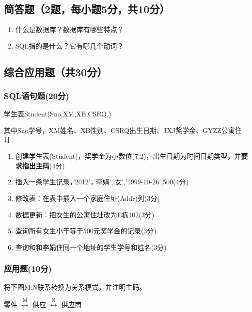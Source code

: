 \documentclass{article}
\begin{document}
\subsection{简答题（2题，每小题5分，共10分）}

\begin{enumerate}
\item 什么是数据库？数据库有哪些特点？

\item SQL指的是什么？它有哪几个动词？
\end{enumerate}

\subsection{综合应用题（共30分）}

\subsubsection{SQL语句题(20分)}

学生表Student(Sno,XM,XB,CSRQ,)

其中Sno学号，XM姓名、XB性别、CSRQ出生日期、JXJ奖学金、GYZZ公寓住址

\begin{enumerate}
\item 创建学生表(Student)，奖学金为小数位(7.2)，出生日期为时间日期类型，并\textbf{要求指出主码}(4分)

\item 插入一条学生记录，'2012'，'李娟','女','1999-10-26',500(4分)

\item 修改表：在表中插入一个家庭住址(Addr)列(3分)

\item 数据更新：把女生的公寓住址改为E栋102(3分)

\item 查询所有女生小于等于500元奖学金的记录(3分)

\item 查询和和李娟住同一个地址的学生学号和姓名(3分)
\end{enumerate}

\subsubsection{应用题(10分)}

将下图M:N联系转换为关系模式，并注明主码。

零件 $\stackrel{\text{M}}{\longleftrightarrow}$ 供应 $\stackrel{\text{N}}{\longleftrightarrow}$ 供应商

% 
% 
\end{document}
